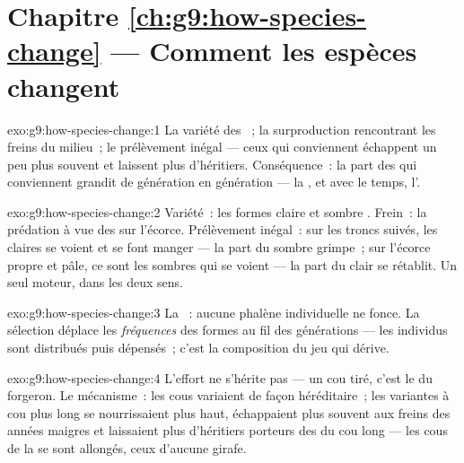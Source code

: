 \section*{Chapitre \ref{ch:g9:how-species-change} --- Comment les espèces changent}

\begin{solution}{exo:g9:how-species-change:1}
La variété des ~; la surproduction
rencontrant les freins du milieu~; le prélèvement inégal ---
ceux qui conviennent échappent un peu plus souvent et
laissent plus d'héritiers. Conséquence~: la part des 
qui conviennent grandit de génération en génération --- la
, et avec le temps, l'.
\end{solution}

\begin{solution}{exo:g9:how-species-change:2}
Variété~: les formes claire et sombre . Frein~:
la prédation à vue des  sur l'écorce. Prélèvement
inégal~: sur les troncs suivés, les claires se voient et se
font manger --- la part du sombre grimpe~; sur l'écorce
propre et pâle, ce sont les sombres qui se voient --- la
part du clair se rétablit. Un seul moteur, dans les deux
sens.
\end{solution}

\begin{solution}{exo:g9:how-species-change:3}
La ~: aucune phalène individuelle ne fonce. La
sélection déplace les \emph{fréquences} des formes
 au fil des générations --- les individus sont
distribués puis dépensés~; c'est la composition du jeu qui
dérive.
\end{solution}

\begin{solution}{exo:g9:how-species-change:4}
L'effort ne s'hérite pas --- un cou tiré, c'est le  du
forgeron. Le mécanisme~: les cous variaient de façon
héréditaire~; les variantes à cou plus long se nourrissaient
plus haut, échappaient plus souvent aux freins des années
maigres et laissaient plus d'héritiers porteurs des 
du cou long --- les cous de la  se sont allongés,
ceux d'aucune girafe.
\end{solution}


